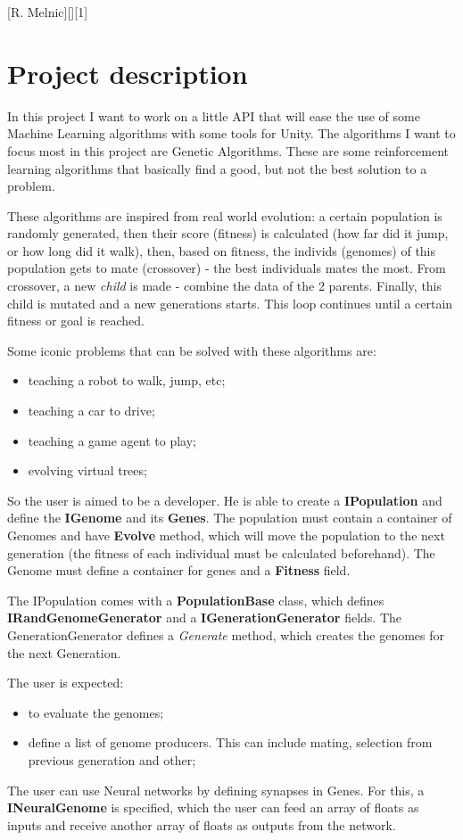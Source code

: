 \documentclass{article}
\begin{document}
	[R. Melnic][][1]

	\section{Project description}
		\par In this project I want to work on a little API that will ease the use of some Machine Learning algorithms with some tools for Unity. The algorithms I want to focus most in this project are Genetic Algorithms. These are some reinforcement learning algorithms that basically find a good, but not the best solution to a problem.

		\par These algorithms are inspired from real world evolution: a certain population is randomly generated, then their score (fitness) is calculated (how far did it jump, or how long did it walk), then, based on fitness, the individs (genomes) of this population gets to mate (crossover) - the best individuals mates the most. From crossover, a new \textit{child} is made - combine the data of the 2 parents. Finally, this child is mutated and a new generations starts. This loop continues until a certain fitness or goal is reached.

		\par Some iconic problems that can be solved with these algorithms are:
		\begin{itemize}
			\item teaching a robot to walk, jump, etc;
			\item teaching a car to drive;
			\item teaching a game agent to play;
			\item evolving virtual trees;
		\end{itemize}

		\par So the user is aimed to be a developer. He is able to create a \textbf{IPopulation} and define the \textbf{IGenome} and its \textbf{Genes}. The population must contain a container of Genomes and have \textbf{Evolve} method, which will move the population to the next generation (the fitness of each individual must be calculated beforehand). The Genome must define a container for genes and a \textbf{Fitness} field.
		\par The IPopulation comes with a \textbf{PopulationBase} class, which defines \textbf{IRandGenomeGenerator} and a \textbf{IGenerationGenerator} fields. The GenerationGenerator defines a \textit{Generate} method, which creates the genomes for the next Generation.
		\par The user is expected:
		\begin{itemize}
			\item to evaluate the genomes;
			\item define a list of genome producers. This can include mating, selection from previous generation and other;
		\end{itemize}
		\par The user can use Neural networks by defining synapses in Genes. For this, a \textbf{INeuralGenome} is specified, which the user can feed an array of floats as inputs and receive another array of floats as outputs from the network.
\end{document}
